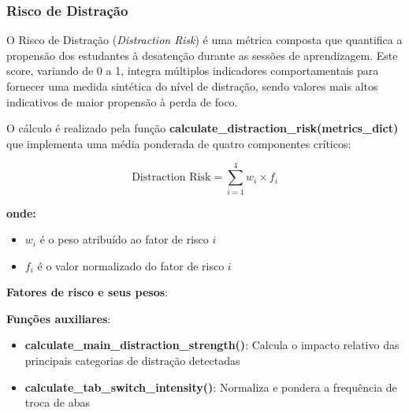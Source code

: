 \subsubsection{Risco de Distração}
O Risco de Distração (\textit{Distraction Risk}) é uma métrica composta que quantifica a propensão dos estudantes à desatenção durante as sessões de aprendizagem. Este score, variando de 0 a 1, integra múltiplos indicadores comportamentais para fornecer uma medida sintética do nível de distração, sendo valores mais altos indicativos de maior propensão à perda de foco.

O cálculo é realizado pela função \textbf{calculate\_distraction\_risk(metrics\_dict)} que implementa uma média ponderada de quatro componentes críticos:

\begin{equation}
\text{Distraction Risk} = \sum_{i=1}^{4} w_i \times f_i
\end{equation}

\textbf{onde:}
\begin{itemize}
    \item $w_i$ é o peso atribuído ao fator de risco $i$
    \item $f_i$ é o valor normalizado do fator de risco $i$
\end{itemize}


% 

\textbf{Fatores de risco e seus pesos}:


\textbf{Funções auxiliares}:
\begin{itemize}
    \item \textbf{calculate\_main\_distraction\_strength()}: Calcula o impacto relativo das principais categorias de distração detectadas
    \item \textbf{calculate\_tab\_switch\_intensity()}: Normaliza e pondera a frequência de troca de abas
\end{itemize}